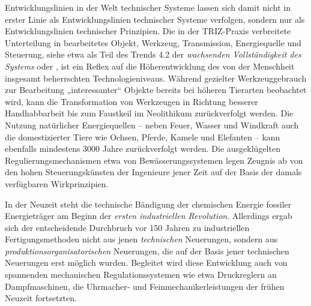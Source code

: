 \documentclass[12pt,a4paper]{article}
\begin{document}
Entwicklungslinien in der Welt technischer Systeme lassen sich damit nicht in
erster Linie als Entwicklungslinien technischer Systeme verfolgen, sondern nur
als Entwicklungslinien technischer Prinzipien. Die in der TRIZ-Praxis
verbreitete Unterteilung in bearbeitetes Objekt, Werkzeug, Transmission,
Energiequelle und Steuerung, siehe etwa \cite{TESE2018} als Teil des Trends
4.2 der \emph{wachsenden Vollständigkeit des Systems} oder \cite{TT}, ist ein
Reflex auf die Höherentwicklung des von der Menschheit insgesamt beherrschten
Technologieniveaus.  Während gezielter Werkzeuggebrauch zur Bearbeitung
„interessanter“ Objekte bereits bei höheren Tierarten beobachtet wird, kann
die Transformation von Werkzeugen in Richtung besserer Handhabbarbeit bis zum
Faustkeil im Neolithikum zurückverfolgt werden.  Die Nutzung natürlicher
Energiequellen -- neben Feuer, Wasser und Windkraft auch die domestizierter
Tiere wie Ochsen, Pferde, Kamele und Elefanten -- kann ebenfalls mindestens
3000 Jahre zurückverfolgt werden. Die ausgeklügelten Regulierungsmechanismen
etwa von Bewässerungssystemen legen Zeugnis ab von den hohen Steuerungskünsten
der Ingenieure jener Zeit auf der Basis der damals verfügbaren Wirkprinzipien.
\enlargethispage{-1em}

In der Neuzeit steht die technische Bändigung der chemischen Energie fossiler
Energieträger am Beginn der \emph{ersten industriellen Revolution}. Allerdings
ergab sich der entscheidende Durchbruch vor 150 Jahren zu industriellen
Fertigungsmethoden nicht aus jenen \emph{technischen} Neuerungen, sondern aus
\emph{produktionsorganisatorischen} Neuerungen, die auf der Basis jener
technischen Neuerungen erst möglich wurden. Begleitet wird diese Entwicklung
auch von spannenden mechanischen Regulationssystemen wie etwa Druckreglern an
Dampfmaschinen, die Uhrmacher- und Feinmechanikerleistungen der frühen Neuzeit
fortsetzten.
\end{document}
